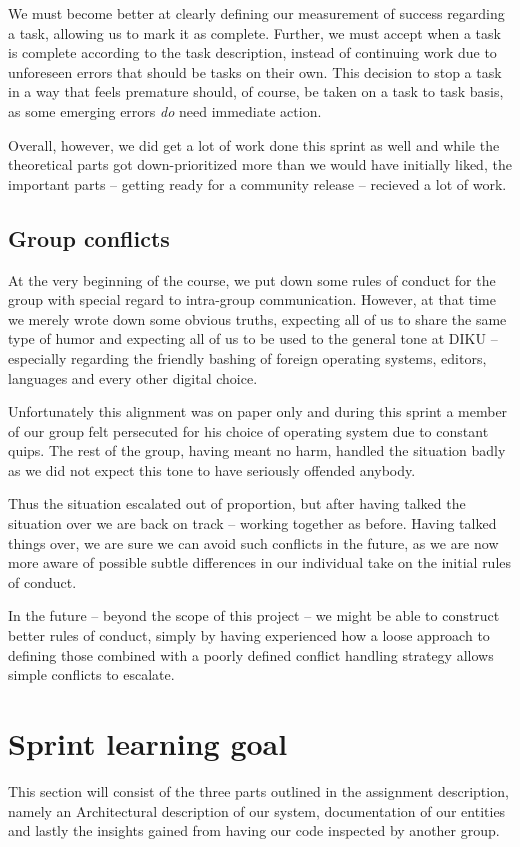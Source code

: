 \documentclass[a4paper,11pt]{article}
\begin{document}
We must become better at clearly defining our measurement of success regarding a
task, allowing us to mark it as complete. Further, we must accept when a task is
complete according to the task description, instead of continuing work due to
unforeseen errors that should be tasks on their own. This decision to stop a task
in a way that feels premature should, of course, be taken on a task to task
basis, as some emerging errors \textit{do} need immediate action.

Overall, however, we did get a lot of work done this sprint as well and while the
theoretical parts got down-prioritized more than we would have initially liked,
the important parts -- getting ready for a community release -- recieved a lot of
work.

\subsection{Group conflicts}
At the very beginning of the course, we put down some rules of conduct for the
group with special regard to intra-group communication. However, at that time
we merely wrote down some obvious truths, expecting all of us to share the same
type of humor and expecting all of us to be used to the general tone at DIKU --
especially regarding the friendly bashing of foreign operating systems, editors,
languages and every other digital choice.

Unfortunately this alignment was on paper only and during this sprint a member
of our group felt persecuted for his choice of operating system due to constant
quips. The rest of the group, having meant no harm, handled the situation badly
as we did not expect this tone to have seriously offended anybody.

Thus the situation escalated out of proportion, but after having talked the
situation over we are back on track -- working together as before. Having talked
things over, we are sure we can avoid such conflicts in the future, as we are
now more aware of possible subtle differences in our individual take on the
initial rules of conduct.

In the future -- beyond the scope of this project -- we might be able to construct
better rules of conduct, simply by having experienced how a loose approach to
defining those combined with a poorly defined
conflict handling strategy allows simple conflicts to escalate.

\section{Sprint learning goal}
\label{sec:learning_goals}
This section will consist of the three parts outlined in the assignment
description, namely an Architectural description of our system, documentation
of our entities and lastly the insights gained from having our code inspected
by another group.
\end{document}
